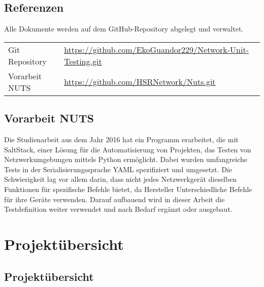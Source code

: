 \documentclass[
	ngerman,
	toc=listof, %
	toc=bibliography, %
	footnotes=multiple, %
	parskip=half, %
	numbers=noendperiod %
]{scrartcl}
\begin{document}
	\subsection{Referenzen}
		Alle Dokumente werden auf dem GitHub-Repository abgelegt und verwaltet.

	\begin{tabularx}{\textwidth}{lX}
		Git Repository & \url{https://github.com/EkoGuandor229/Network-Unit-Testing.git} \\
		Vorarbeit NUTS & \url{https://github.com/HSRNetwork/Nuts.git}\\
	\end{tabularx}

	\subsection{Vorarbeit NUTS}
		Die Studienarbeit aus dem Jahr 2016 hat ein Programm erarbeitet, die mit SaltStack, einer Lösung für die Automatisierung von Projekten, das Testen von Netzwerkumgebungen mittels Python ermöglicht.
		Dabei wurden umfangreiche Tests in der Serialisierungssprache YAML spezifiziert und umgesetzt. 
		Die Schwierigkeit lag vor allem darin, dass nicht jedes Netzwerkgerät dieselben Funktionen für spezifische Befehle bietet, da Hersteller Unterschiedliche Befehle für ihre Geräte verwenden.	
		Darauf aufbauend wird in dieser Arbeit die Testdefinition weiter verwendet und nach Bedarf ergänzt oder ausgebaut.

\section{Projektübersicht}

	\subsection{Projektübersicht}
\end{document}
